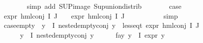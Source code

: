 \begin{isabellebody}
\ \ \ \ \ \ \isamarkupfalse%
\ {\isacharparenleft}{\kern0pt}simp\ add{\isacharcolon}{\kern0pt}\ SUP{\isacharunderscore}{\kern0pt}image\ Sup{\isacharunderscore}{\kern0pt}union{\isacharunderscore}{\kern0pt}distrib{\isacharparenright}{\kern0pt}\isanewline
\ \ \ \ \isamarkupfalse%
\ \isamarkupfalse%
\ {\isacharquery}{\kern0pt}case\ \isamarkupfalse%
\ {\isacartoucheopen}expr{\isacharunderscore}{\kern0pt}{}\ {\isacharparenleft}{\kern0pt}hml{\isacharunderscore}{\kern0pt}conj\ I\ J\ {\isasymPhi}{\isacharparenright}{\kern0pt}\ {\isasymle}\ {}{\isacartoucheclose}\ {\isacartoucheopen}expr{\isacharunderscore}{\kern0pt}{}\ {\isacharparenleft}{\kern0pt}hml{\isacharunderscore}{\kern0pt}conj\ I\ J\ {\isasymPhi}{\isacharparenright}{\kern0pt}\ {\isasymle}\ {}{\isacartoucheclose}\isanewline
\ \ \ \ \ \ \isamarkupfalse%
\ simp\isanewline
\ \ \isamarkupfalse%
\isanewline
\isanewline
\ \ \isamarkupfalse%
\ case{\isacharunderscore}{\kern0pt}empty{\isacharcolon}{\kern0pt}\ {\isachardoublequoteopen}\ {\isacharparenleft}{\kern0pt}{\isasymforall}y{\isasymin}{\isasymPhi}\ {\isacharbackquote}{\kern0pt}\ I{\isachardot}{\kern0pt}\ nested{\isacharunderscore}{\kern0pt}empty{\isacharunderscore}{\kern0pt}conj\ y{\isacharparenright}{\kern0pt}\ {\isasymlongrightarrow}\ less{\isacharunderscore}{\kern0pt}eq{\isacharunderscore}{\kern0pt}t\ {\isacharparenleft}{\kern0pt}expr\ {\isacharparenleft}{\kern0pt}hml{\isacharunderscore}{\kern0pt}conj\ I\ J\ {\isasymPhi}{\isacharparenright}{\kern0pt}{\isacharparenright}{\kern0pt}\ {\isacharparenleft}{\kern0pt}{\isasyminfinity}{\isacharcomma}{\kern0pt}\ {\isasyminfinity}{\isacharcomma}{\kern0pt}\ {\isasyminfinity}{\isacharcomma}{\kern0pt}\ {}{\isacharcomma}{\kern0pt}\ {}{\isacharcomma}{\kern0pt}\ {}{\isacharparenright}{\kern0pt}{\isachardoublequoteclose}\isanewline
\ \ \isamarkupfalse%
\isanewline
\ \ \ \ \isamarkupfalse%
\ {\isachardoublequoteopen}{\isasymforall}y{\isasymin}{\isasymPhi}\ {\isacharbackquote}{\kern0pt}\ I{\isachardot}{\kern0pt}\ nested{\isacharunderscore}{\kern0pt}empty{\isacharunderscore}{\kern0pt}conj\ y{\isachardoublequoteclose}\isanewline
\ \ \ \ \isamarkupfalse%
\ fa{\isacharunderscore}{\kern0pt}y{\isacharcolon}{\kern0pt}\ {\isachardoublequoteopen}{\isasymforall}y{\isasymin}{\isasymPhi}\ {\isacharbackquote}{\kern0pt}\ I{\isachardot}{\kern0pt}\ expr{\isacharunderscore}{\kern0pt}{}\ y\ {\isasymle}\ {}{\isachardoublequoteclose}\isanewline

\end{isabellebody}
